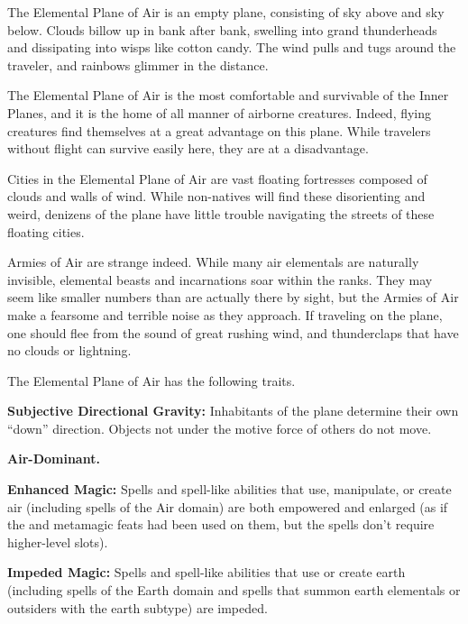 The Elemental Plane of Air is an empty plane, consisting of sky above and sky below. Clouds billow up in bank after bank, swelling into grand thunderheads and dissipating into wisps like cotton candy. The wind pulls and tugs around the traveler, and rainbows glimmer in the distance.

The Elemental Plane of Air is the most comfortable and survivable of the Inner Planes, and it is the home of all manner of airborne creatures. Indeed, flying creatures find themselves at a great advantage on this plane. While travelers without flight can survive easily here, they are at a disadvantage.

Cities in the Elemental Plane of Air are vast floating fortresses composed of clouds and walls of wind. While non-natives will find these disorienting and weird, denizens of the plane have little trouble navigating the streets of these floating cities.

Armies of Air are strange indeed. While many air elementals are naturally invisible, elemental beasts and incarnations soar within the ranks. They may seem like smaller numbers than are actually there by sight, but the Armies of Air make a fearsome and terrible noise as they approach. If traveling on the plane, one should flee from the sound of great rushing wind, and thunderclaps that have no clouds or lightning.

The Elemental Plane of Air has the following traits.
\begin{itemize*}
\item \textbf{Subjective Directional Gravity:} Inhabitants of the plane determine their own ``down'' direction. Objects not under the motive force of others do not move.
\item \textbf{Air-Dominant.}
\item \textbf{Enhanced Magic:} Spells and spell-like abilities that use, manipulate, or create air (including spells of the Air domain) are both empowered and enlarged (as if the  and  metamagic feats had been used on them, but the spells don't require higher-level slots).
\item \textbf{Impeded Magic:} Spells and spell-like abilities that use or create earth (including spells of the Earth domain and spells that summon earth elementals or outsiders with the earth subtype) are impeded.
\end{itemize*}
